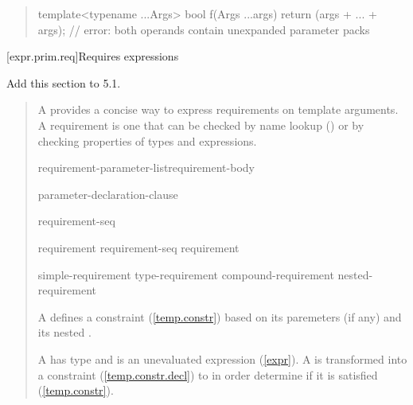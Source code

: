 \begin{quote}
\begin{codeblock}
template<typename ...Args>
bool f(Args ...args) {
  return (args + ... + args); // error: both operands contain unexpanded parameter packs
}
\end{codeblock}
\exitexample

\end{quote}


[expr.prim.req]{Requires expressions}

Add this section to 5.1.

\begin{quote}

\pnum
A  provides a concise way to express 
requirements on template arguments. 
% 
A requirement is one that can be checked by name lookup
() or by checking properties of types and expressions.

\begin{bnf}
\br
     requirement-parameter-list\opt requirement-body

\br
    \terminal{(} parameter-declaration-clause\opt~\terminal{)}
  
\br
    \terminal{\{} requirement-seq \terminal{\}}

\br
    requirement\br
    requirement-seq requirement

\br
    simple-requirement\br
    type-requirement\br
    compound-requirement\br
    nested-requirement
\end{bnf}

\pnum
A  defines a constraint (\ref{temp.constr})
based on its paremeters (if any) and its nested .

\pnum
A  has type  and is an 
unevaluated expression (\ref{expr}).
\enternote
A  is transformed into a constraint 
(\ref{temp.constr.decl}) to in order determine if it is 
satisfied (\ref{temp.constr}).
\exitnote


\end{quote}
